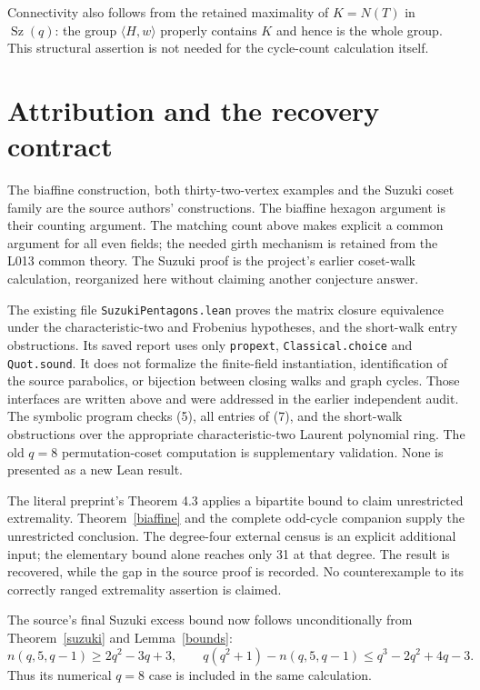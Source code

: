 \documentclass[11pt,a4paper]{article}
\newcommand{\gen}[1]{\langle #1\rangle}
\begin{document}
Connectivity also follows from the retained maximality of $K=N(T)$
in $\operatorname{Sz}(q)$: the group $\gen{H,w}$ properly contains
$K$ and hence is the whole group. This structural assertion is not
needed for the cycle-count calculation itself.

\section{Attribution and the recovery contract}
The biaffine construction, both thirty-two-vertex examples and the
Suzuki coset family are the source authors' constructions. The
biaffine hexagon argument is their counting argument. The matching
count above makes explicit a common argument for all even fields;
the needed girth mechanism is retained from the L013 common theory.
The Suzuki proof is the project's earlier coset-walk calculation,
reorganized here without claiming another conjecture answer.

The existing file \texttt{SuzukiPentagons.lean} proves the matrix
closure equivalence under the characteristic-two and Frobenius
hypotheses, and the short-walk entry obstructions. Its saved report
uses only \texttt{propext}, \texttt{Classical.choice} and
\texttt{Quot.sound}. It does not formalize the finite-field
instantiation, identification of the source parabolics, or bijection
between closing walks and graph cycles. Those interfaces are written
above and were addressed in the earlier independent audit. The
symbolic program checks (5), all entries of (7), and the short-walk
obstructions over the appropriate characteristic-two Laurent
polynomial ring. The old $q=8$ permutation-coset computation is
supplementary validation. None is presented as a new Lean result.

The literal preprint's Theorem 4.3 applies a bipartite bound to
claim unrestricted extremality. Theorem~\ref{biaffine} and the
complete odd-cycle companion supply the unrestricted conclusion.
The degree-four external census is an explicit additional input;
the elementary bound alone reaches only 31 at that degree.
The result is recovered, while the gap in the source proof is recorded.
No counterexample to its correctly ranged extremality assertion is claimed.

The source's final Suzuki excess bound now follows unconditionally
from Theorem~\ref{suzuki} and Lemma~\ref{bounds}:
\[
n(q,5,q-1)\geq2q^2-3q+3,\qquad
q(q^2+1)-n(q,5,q-1)\leq q^3-2q^2+4q-3.
\]
Thus its numerical $q=8$ case is included in the same calculation.
\end{document}

